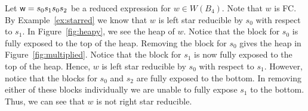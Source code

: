 \begin{example}\label{ex:starredheap}
Let $\mathsf{w}=s_0s_1s_0s_2$ be a reduced expression for $w \in W(B_4)$. Note that $w$ is FC. By Example~\ref{ex:starred} we know that $w$ is left star reducible by $s_0$ with respect to $s_1$. In Figure~\ref{fig:heapy}, we see the heap of $w$. Notice that the block for $s_0$ is fully exposed to the top of the heap. Removing the block for $s_0$ gives the heap in Figure~\ref{fig:multiplied}. Notice that the block for $s_1$ is now fully exposed to the top of the heap. Hence, $w$ is left star reducible by $s_0$ with respect to $s_1$. However, notice that the blocks for $s_0$ and $s_2$ are fully exposed to the bottom. In removing either of these blocks individually we are unable to fully expose $s_1$ to the bottom. Thus, we can see that $w$ is not right star reducible.  
\end{example}



